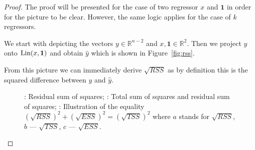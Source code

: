 \begin{proof}
The proof will be presented for the case of two regressor $x$ and $\mathbf{1}$ in order for the picture to be clear.
However, the same logic applies for the case of $k$ regressors.

We start with depicting the vectors $y \in \mathbb{R}^{n-2}$ and $x, \mathbf{1} \in \mathbb{R}^2$.
Then we project $y$ onto $\operatorname{Lin}(x, \mathbf{1})$ and obtain $\hat y$ which is shown in Figure~\ref{fig:rss}.

From this picture we can immediately derive $\sqrt{RSS}$ as by definition this is the squared difference between $y$ and $\hat y$.

\begin{figure}[h!]
\begin{center}
\hspace{4ex}
\caption{: Residual sum of squares;
: Total sum of squares and residual sum of squares;
: Illustration of the equality $(\sqrt{RSS})^2 + (\sqrt{ESS})^2 = (\sqrt{TSS})^2$
where $a$ stands for $\sqrt{RSS}$, $b$ — $\sqrt{TSS}$, $c$ — $\sqrt{ESS}$.}
\end{center}
\end{figure}


\end{proof}
